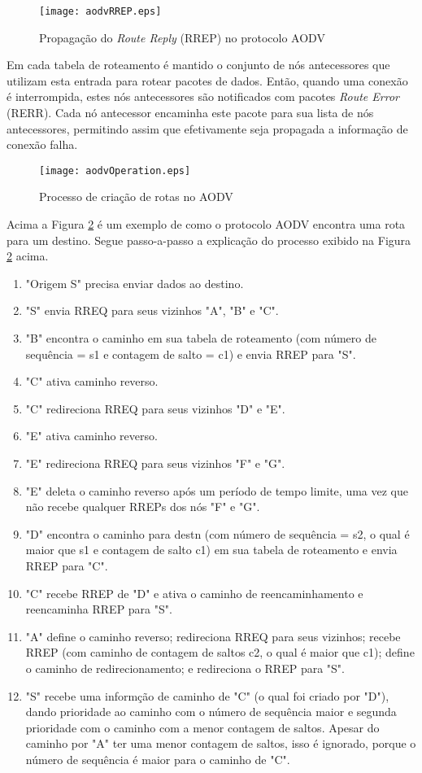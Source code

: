 \begin{figure}[H]
	\centering
	\texttt{[image: aodvRREP.eps]}
	\caption{Propaga\c{c}\~ao do \textit{Route Reply} (RREP) no protocolo AODV \cite{pereira}}
	\label{figAodvRrep}
\end{figure}

Em cada tabela de roteamento \'e mantido o conjunto de n\'os antecessores que utilizam esta entrada para rotear pacotes de dados. Ent\~ao, quando uma conex\~ao \'e interrompida, estes n\'os antecessores s\~ao notificados com pacotes \textit{Route Error} (RERR). Cada n\'o antecessor encaminha este pacote para sua lista de n\'os antecessores, permitindo assim que efetivamente seja propagada a informa\c{c}\~ao de conex\~ao falha.

\begin{figure}[H]
	\centering
	\texttt{[image: aodvOperation.eps]}
	\caption{Processo de cria\c{c}\~ao de rotas no AODV \cite{gorantala}}
	\label{figOpAODV}
\end{figure}
Acima a Figura \ref{figOpAODV} \'e um exemplo de como o protocolo AODV encontra uma rota para um destino.
Segue passo-a-passo a explica\c{c}\~ao do processo exibido na Figura \ref{figOpAODV} acima.
\begin{enumerate}
	\item "Origem S" precisa enviar dados ao destino.
	\item "S" envia RREQ para seus vizinhos "A", "B" e "C".
	\item "B" encontra o caminho em sua tabela de roteamento (com n\'umero de sequ\^encia = s1 e contagem de salto = c1) e envia RREP para "S".
	\item "C" ativa caminho reverso.
	\item "C" redireciona RREQ para seus vizinhos "D" e "E".
	\item "E" ativa caminho reverso.
	\item "E" redireciona RREQ para seus vizinhos "F" e "G".
	\item "E" deleta o caminho reverso ap\'os um per\'iodo de tempo limite, uma vez que n\~ao recebe qualquer RREPs dos n\'os "F" e "G".
	\item "D" encontra o caminho para destn (com n\'umero de sequ\^encia = s2, o qual \'e maior que s1 e contagem de salto c1) em sua tabela de roteamento e envia RREP para "C".
	\item "C" recebe RREP de "D" e ativa o caminho de reencaminhamento e reencaminha RREP para "S".
	\item "A" define o caminho reverso; redireciona RREQ para seus vizinhos; recebe RREP (com caminho de contagem de saltos c2, o qual \'e maior que c1); define o caminho de redirecionamento; e redireciona o RREP para "S".
	\item "S" recebe uma inform\c{c}\~ao de caminho de "C" (o qual foi criado por "D"), dando prioridade ao caminho com o n\'umero de sequ\^encia maior e segunda prioridade com o caminho com a menor contagem de saltos. Apesar do caminho por "A" ter uma menor contagem de saltos, isso \'e ignorado, porque o n\'umero de sequ\^encia \'e maior para o caminho de "C".
\end{enumerate}

